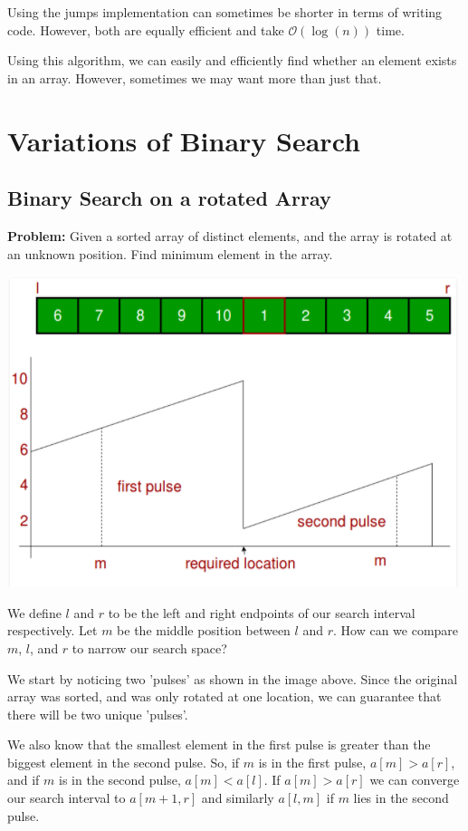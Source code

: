 \documentclass{article}
\begin{document}
Using the jumps implementation can sometimes be shorter in terms of writing code. However, both are equally efficient and take $\mathcal{O}(\log(n))$ time.

Using this algorithm, we can easily and efficiently find whether an element exists in an array. However, sometimes we may want more than just that.
\section{Variations of Binary Search}
\subsection{Binary Search on a rotated Array}
\textbf{Problem: } Given a sorted array of distinct elements, and the array is rotated at an unknown position. Find minimum element in the array.

\includegraphics{rotatedbinarysearch.png}

We define $l$ and $r$ to be the left and right endpoints of our search interval respectively. Let $m$ be the middle position between $l$ and $r$. How can we compare $m$, $l$, and $r$ to narrow our search space?

We start by noticing two 'pulses' as shown in the image above. Since the original array was sorted, and was only rotated at one location, we can guarantee that there will be two unique 'pulses'. 

We also know that the smallest element in the first pulse is greater than the biggest element in the second pulse. So, if $m$ is in the first pulse, $a[m] > a[r]$, and if $m$ is in the second pulse, $a[m] < a[l]$. If $a[m] > a[r]$ we can converge our search interval to $a[m+1, r]$ and similarly $a[l, m]$ if $m$ lies in the second pulse.
\end{document}
